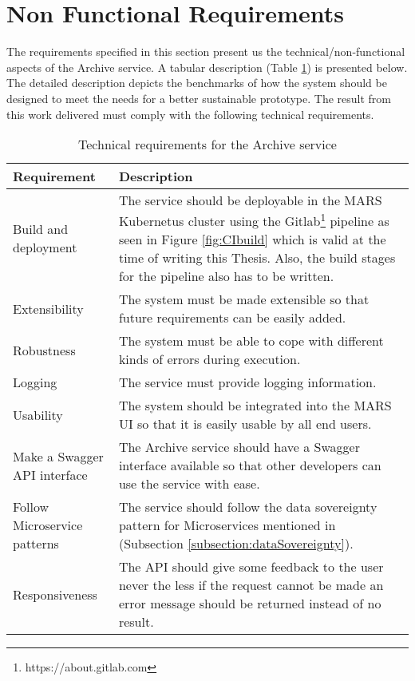 \section{Non Functional Requirements}
\label{section:technicalReq}
The requirements specified in this section present us the technical/non-functional aspects of the Archive service. A tabular description 
(Table \ref{table: Technical Requirements}) is presented below.
The detailed description depicts the benchmarks of how the system should be designed to meet the needs for a better sustainable prototype.
The result from this work delivered must comply with the following technical requirements.
\begin{table}[h!]
    \centering
    \begin{tabular}{|p{3cm}|p{12cm}|}
            \hline
                \textbf{Requirement}  & \textbf{Description}\\
            \hline
                 Build and deployment & 
                 The service should be deployable in the MARS Kubernetus \cite{kubernetes} cluster using the Gitlab\footnote{https://about.gitlab.com} pipeline as seen in Figure \ref{fig:CIbuild}
                 which is valid at the time of writing this Thesis. Also,
                 the build stages for the pipeline also has to be written. \\
            \hline
                 Extensibility & The system must be made extensible so that future requirements can be easily added.\\
            \hline
                 Robustness & The system must be able to cope with different kinds of errors during execution.\\    
            \hline
                 Logging &  The service must provide logging information.\\    
            \hline
                 Usability & The system should be integrated into the MARS UI so that it is easily usable by all end users.\\     
            \hline
                 Make a Swagger API interface & The Archive service should have a Swagger \cite{swagger} interface available so that other 
                 developers can use the service with ease.\\         
            \hline
                Follow Microservice patterns & The service should follow the data sovereignty pattern for Microservices mentioned in 
                (Subsection \ref{subsection:dataSovereignty}).\\ 
            \hline
                Responsiveness & The API should give some feedback to the user never the less if the request cannot be made an 
                error message should be returned instead of no result.\\      
            \hline
           
    \end{tabular} 
    \caption{Technical requirements for the Archive service}
    \label{table: Technical Requirements}  
    \end{table} 
  
    